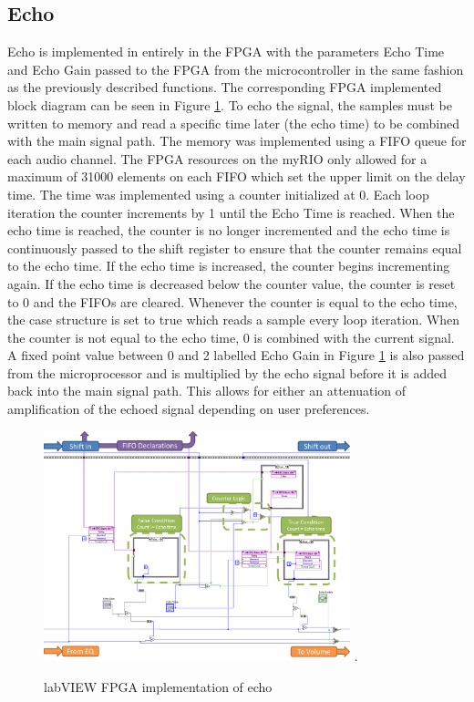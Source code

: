 \subsection{Echo}
Echo is implemented in entirely in the FPGA with the parameters Echo Time and Echo Gain passed to the FPGA from the microcontroller in the same fashion as the previously described functions. 
The corresponding FPGA implemented block diagram can be seen in Figure \ref{fig_echo}.
To echo the signal, the samples must be written to memory and read a specific time later (the echo time) to be combined with the main signal path. 
The memory was implemented using a FIFO queue for each audio channel. The FPGA resources on the myRIO only allowed for a maximum of 31000 elements on each FIFO which set the upper limit on the delay time. 
The time was implemented using a counter initialized at 0. Each loop iteration the counter increments by 1 until the Echo Time is reached. 
When the echo time is reached, the counter is no longer incremented and the echo time is continuously passed to the shift register to ensure that the counter remains equal to the echo time.
If the echo time is increased, the counter begins incrementing again. If the echo time is decreased below the counter value, the counter is reset to 0 and the FIFOs are cleared. 
Whenever the counter is equal to the echo time, the case structure is set to true which reads a sample every loop iteration. 
When the counter is not equal to the echo time, 0 is combined with the current signal. 
A fixed point value between 0 and 2 labelled Echo Gain in Figure \ref{fig_echo} is also passed from the microprocessor and is multiplied by the echo signal before it is added back into the main signal path. 
This allows for either an attenuation of amplification of the echoed signal depending on user preferences.  

\begin{figure}[!t]
\centering
\includegraphics[width=3.5in]{echo.png}
\DeclareGraphicsExtensions.
\caption{labVIEW FPGA implementation of echo}
\label{fig_echo}
\end{figure} 


